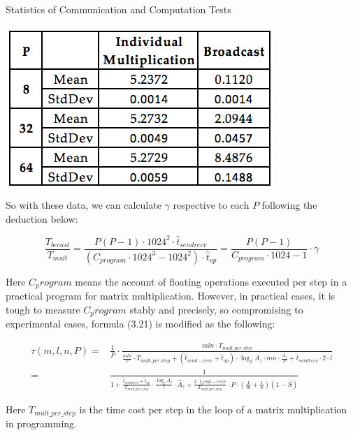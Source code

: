 \documentclass{amsart}
\theoremstyle{definition}
\theoremstyle{remark}
\numberwithin{equation}{section}
\begin{document}
\begin{table}[h]
\caption{Statistics of Communication and Computation Tests}
\includegraphics[scale=0.9]{figures/table_1.png}
\end{table}

So with these data, we can calculate $\gamma$ respective to each $P$ following the deduction below:

\begin{equation}
	\frac{T_{becast}}{T_{mult}} = \frac{P(P-1)\cdot 1024^{2} \cdot \hat{t}_{sendrecv}}{(C_{program} \cdot 1024^3 - 1024^2) \cdot \hat{t}_{op} } = \frac{P(P-1)}{C_{program} \cdot 1024 -1} \cdot \gamma
\end{equation}

Here $C_program$ means the account of floating operations executed per step in a practical program for matrix multiplication. However, in practical cases, it is tough to measure $C_program$ stably and precisely, so compromising to experimental cases, formula (3.21) is modified as the following:

\begin{equation} 
	\renewcommand\arraystretch{1.75}
	\begin{array}{rl}
	\tau(m,l,n,P) =& \frac{1}{P} \cdot \frac{mln \cdot T_{mult \_ per \_ step}}{\frac{mln}{P} \cdot T_{mult \_ per \_ step} + (\hat{t}_{send-recv} + \hat{t}_{op}) \cdot \log_{2} A_{z} \cdot mn \cdot \frac{A_{z}}{P} + \hat{t}_{sendrecv} \cdot 2 \cdot l}\\ 
	=& \frac{1}{1 + \frac{\hat{t}_{sendrecv} + \hat{t}_{op}}{T_{mult \_ per \_ step} } \cdot \frac{\log_{2} \hat{A}_{z}}{l} \cdot \hat{A}_{z} + \frac{2 \cdot \hat{t}_send-recv}{T_{mult \_ per \_ step}} \cdot P \cdot (\frac{1}{m} + \frac{1}{n})(1- \bar{S}) }
	\end{array}
\end{equation}

Here $T_{mult \_ per \_ step}$ is the time cost per step in the loop of a matrix multiplication in programming.
		
\end{document}
